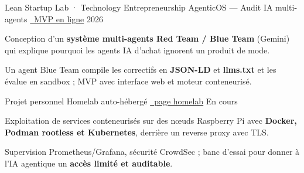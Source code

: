 \documentclass[11pt, a4paper]{../awesome-cv}
\begin{document}
\begin{cventries}
  \cventry
    {Lean Startup Lab · Technology Entrepreneurship}
    {AgenticOS — Audit IA multi-agents}
    {\href{https://agenticos-mvp.netlify.app}{\faGlobe\ MVP en ligne}}
    {2026}
    {
      \begin{cvitems}
        \item {Conception d'un \textbf{système multi-agents Red Team / Blue Team} (Gemini) qui explique pourquoi les agents IA d'achat ignorent un produit de mode.}
        \item {Un agent Blue Team compile les correctifs en \textbf{JSON-LD} et \textbf{llms.txt} et les évalue en sandbox ; MVP avec interface web et moteur conteneurisé.}
      \end{cvitems}
    }

  \cventry
    {Projet personnel}
    {Homelab auto-hébergé}
    {\href{https://mattia-giovannini.github.io/homelab/}{\faGlobe\ page homelab}}
    {En cours}
    {
      \begin{cvitems}
        \item {Exploitation de services conteneurisés sur des nœuds Raspberry Pi avec \textbf{Docker, Podman rootless et Kubernetes}, derrière un reverse proxy avec TLS.}
        \item {Supervision Prometheus/Grafana, sécurité CrowdSec ; banc d'essai pour donner à l'IA agentique un \textbf{accès limité et auditable}.}
      \end{cvitems}
    }
\end{cventries}

\begin{cvskills}
\end{cvskills}

\begin{cvskills}
\end{cvskills}
\end{document}

